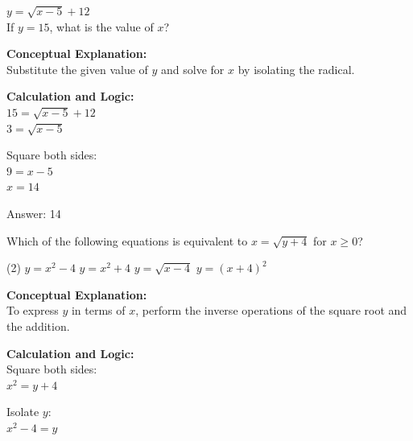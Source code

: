 \documentclass[11pt,paper=a4,answers]{exam}
\begin{document}
\begin{questions}
\vspace{40pt}

\question
$y = \sqrt{x - 5} + 12$ \\
If $y = 15$, what is the value of $x$?

\begin{solution}
\textbf{Conceptual Explanation:} \\
Substitute the given value of $y$ and solve for $x$ by isolating the radical.

\vspace{20pt}

\textbf{Calculation and Logic:} \\
$15 = \sqrt{x - 5} + 12$ \\
$3 = \sqrt{x - 5}$

\vspace{10pt}

Square both sides: \\
$9 = x - 5$ \\
$x = 14$

\vspace{25pt}

Answer: \colorbox{yellow!100}{14}
\end{solution}

\question
Which of the following equations is equivalent to $x = \sqrt{y + 4}$ for $x \geq 0$?
\begin{tasks}(2)
    \task $y = x^2 - 4$
    \task $y = x^2 + 4$
    \task $y = \sqrt{x - 4}$
    \task $y = (x + 4)^2$
\end{tasks}

\begin{solution}
\textbf{Conceptual Explanation:} \\
To express $y$ in terms of $x$, perform the inverse operations of the square root and the addition.

\vspace{20pt}

\textbf{Calculation and Logic:} \\
Square both sides: \\
$x^2 = y + 4$

\vspace{10pt}

Isolate $y$: \\
$x^2 - 4 = y$

\vspace{25pt}


\end{solution}
\end{questions}
\end{document}
